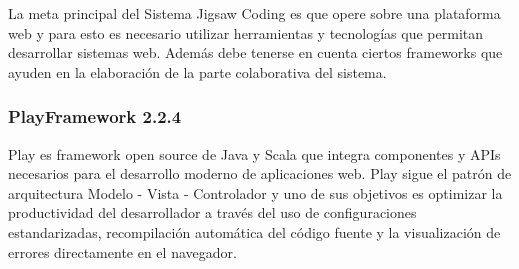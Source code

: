 La meta principal del Sistema Jigsaw Coding es que opere sobre una plataforma web y para esto es necesario utilizar herramientas y tecnologías que permitan desarrollar sistemas web. Además debe tenerse en cuenta ciertos frameworks que ayuden en la elaboración de la parte colaborativa del sistema.

\subsubsection{PlayFramework 2.2.4}
Play es framework open source de Java y Scala que integra componentes y APIs necesarios para el desarrollo moderno de aplicaciones web. Play sigue el patrón de arquitectura Modelo - Vista - Controlador y uno de sus objetivos es optimizar la productividad del desarrollador a través del uso de configuraciones estandarizadas, recompilación automática del código fuente y la visualización de errores directamente en el navegador.

%
%

